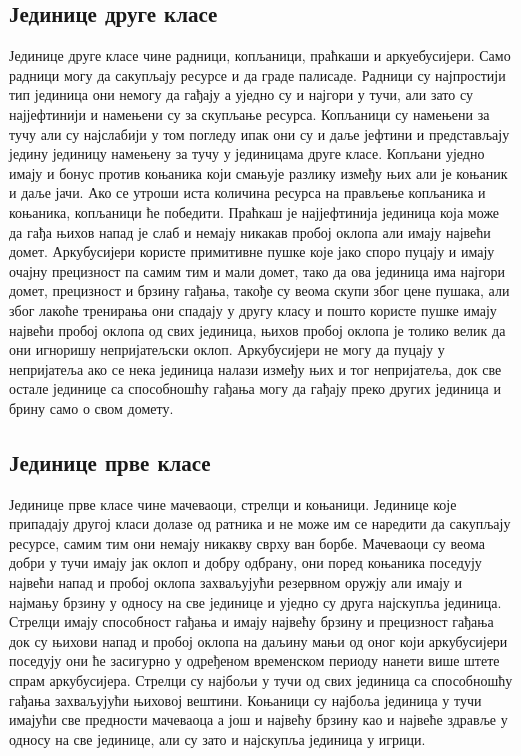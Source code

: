 \documentclass[11pt,a4paper]{report}
\begin{document}
\subsection{Јединице друге класе}
Јединице друге класе чине радници, копљаници, праћкаши и аркуебусијери. Само радници могу да сакупљају ресурсе и да граде палисаде. Радници су најпростији тип јединица они немогу да гађају а уједно су и најгори у тучи, али зато су најјефтинији и намењени су за скупљање ресурса. Копљаници су намењени за тучу али су најслабији у том погледу ипак они су и даље јефтини и представљају једину јединицу намењену за тучу у јединицама друге класе. Копљани уједно имају и бонус против коњаника који смањује разлику између њих али је коњаник и даље јачи. Ако се утроши иста количина ресурса на прављење копљаника и коњаника, копљаници ће победити. Праћкаш је најјефтинија јединица која може да гађа њихов напад је слаб и немају никакав пробој оклопа али имају највећи домет. Аркубусијери користе примитивне пушке које јако споро пуцају и имају очајну прецизност па самим тим и мали домет, тако да ова јединица има најгори домет, прецизност и брзину гађања, такође су веома скупи због цене пушака, али због лакоће тренирања они спадају у другу класу и пошто користе пушке имају највећи пробој оклопа од свих јединица, њихов пробој оклопа је толико велик да они игноришу непријатељски оклоп. Аркубусијери не могу да пуцају у непријатеља ако се нека јединица налази између њих и тог непријатеља, док све остале јединице са способношћу гађања могу да гађају преко других јединица и брину само о свом домету.

\subsection{Јединице прве класе}
Јединице прве класе чине  мачеваоци, стрелци и коњаници. Јединице које припадају другој класи долазе од ратника и не може им се наредити да сакупљају ресурсе, самим тим они немају никакву сврху ван борбе. Мачеваоци су веома добри у тучи имају јак оклоп и добру одбрану, они поред коњаника поседују највећи напад и пробој оклопа захваљујући резервном оружју али имају и најмању брзину у односу на све јединице и уједно су друга најскупља јединица. Стрелци имају способност гађања и имају највећу брзину и прецизност гађања док су њихови напад и пробој оклопа на даљину мањи од оног који аркубусијери поседују они ће засигурно у одређеном временском периоду нанети више штете спрам аркубусијера. Стрелци су најбољи у тучи од свих јединица са способношћу гађања захваљујући њиховој вештини. Коњаници су најбоља јединица у тучи имајући све предности мачеваоца а још и највећу брзину као и највеће здравље у односу на све јединице, али су зато и најскупља јединица у игрици.
\end{document}
